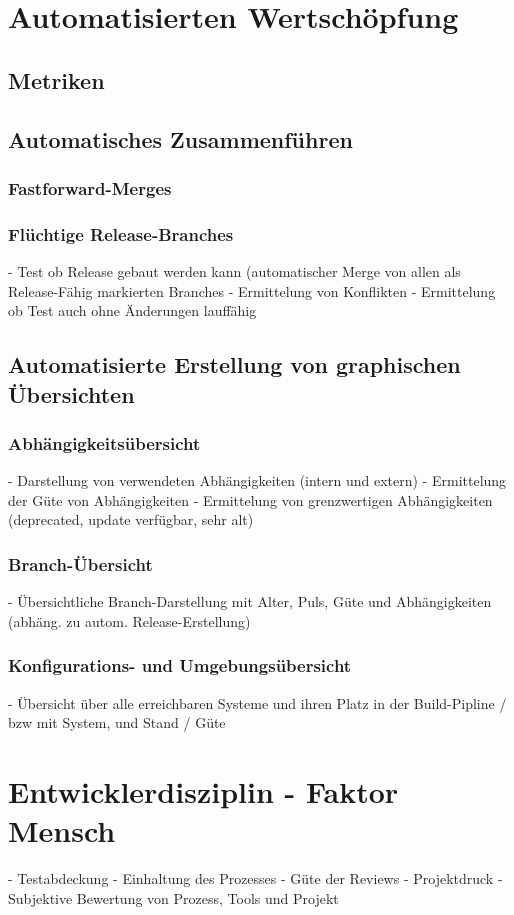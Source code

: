 \section{Automatisierten Wertschöpfung}
\subsection{Metriken}
\label{subsec:auto-values-metrics}
\subsection{Automatisches Zusammenführen}
\subsubsection{Fastforward-Merges}
\subsubsection{Flüchtige Release-Branches}
- Test ob Release gebaut werden kann (automatischer Merge von allen als Release-Fähig markierten Branches
- Ermittelung von Konflikten
- Ermittelung ob Test auch ohne Änderungen lauffähig
\subsection{Automatisierte Erstellung von graphischen Übersichten}
\subsubsection{Abhängigkeitsübersicht}
- Darstellung von verwendeten Abhängigkeiten (intern und extern)
- Ermittelung der Güte von Abhängigkeiten
- Ermittelung von grenzwertigen Abhängigkeiten (deprecated, update verfügbar, sehr alt)
\subsubsection{Branch-Übersicht}
- Übersichtliche Branch-Darstellung mit Alter, Puls, Güte und Abhängigkeiten (abhäng. zu autom. Release-Erstellung)
\subsubsection{Konfigurations- und Umgebungsübersicht}
- Übersicht über alle erreichbaren Systeme und ihren Platz in der Build-Pipline / bzw mit System, und Stand / Güte
\section{Entwicklerdisziplin - Faktor Mensch}
\label{sec:human-fail}
- Testabdeckung
- Einhaltung des Prozesses
- Güte der Reviews
- Projektdruck
- Subjektive Bewertung von Prozess, Tools und Projekt

